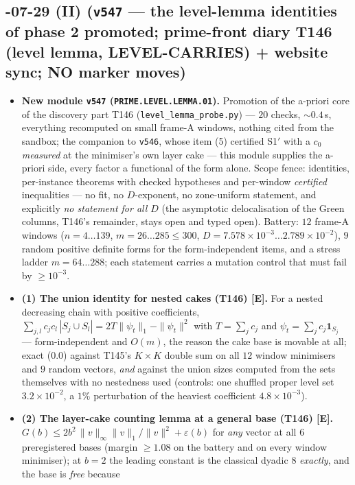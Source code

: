 \documentclass[11pt]{article}
\providecommand{\mE}{\textbf{[E]}}\providecommand{\mC}{\textbf{[C]}}
\begin{document}
\subsection*{-07-29 (II) (\texttt{v547} --- the level-lemma identities of phase 2 promoted; prime-front diary T146 (level lemma, LEVEL-CARRIES) + website sync; NO marker moves)}
\begin{itemize}[leftmargin=1.5em]
\item \textbf{New module \texttt{v547} (\texttt{PRIME.LEVEL.LEMMA.01}).} Promotion of the a-priori
core of the discovery part T146 (\texttt{level\_lemma\_probe.py}) --- $20$ checks, ${\sim}0.4$\,s,
everything recomputed on small frame-A windows, nothing cited from the sandbox; the companion to
\texttt{v546}, whose item (5) certified S1$'$ with a $c_0$ \emph{measured} at the minimiser's own
layer cake --- this module supplies the a-priori side, every factor a functional of the form alone.
Scope fence: identities, per-instance theorems with checked hypotheses and per-window
\emph{certified} inequalities --- no fit, no $D$-exponent, no zone-uniform statement, and explicitly
\emph{no statement for all $D$} (the asymptotic delocalisation of the Green columns, T146's
remainder, stays open and typed open). Battery: $12$ frame-A windows ($n=4\ldots139$,
$m=26\ldots285\le300$, $D=7.578\times10^{-3}\ldots2.789\times10^{-2}$), $9$ random positive definite
forms for the form-independent items, and a stress ladder $m=64\ldots288$; each statement carries a
mutation control that must fail by $\ge10^{-3}$.
\item \textbf{(1) The union identity for nested cakes (T146) \mE.} For a nested decreasing chain
with positive coefficients,
$\sum_{j,l}c_jc_l\,|S_j\cup S_l|=2T\|\psi_t\|_1-\|\psi_t\|^2$ with $T=\sum_jc_j$ and
$\psi_t=\sum_jc_j\mathbf 1_{S_j}$ --- form-independent and $O(m)$, the reason the cake base is
movable at all; exact ($0.0$) against T145's $K\times K$ double sum on all $12$ window minimisers
and $9$ random vectors, \emph{and} against the union sizes computed from the sets themselves with
no nestedness used (controls: one shuffled proper level set $3.2\times10^{-2}$, a $1\%$
perturbation of the heaviest coefficient $4.8\times10^{-3}$).
\item \textbf{(2) The layer-cake counting lemma at a general base (T146) \mE.}
$G(b)\le2b^2\,\|v\|_\infty\|v\|_1/\|v\|^2+\varepsilon(b)$ for \emph{any} vector at all $6$
preregistered bases (margin $\ge1.08$ on the battery and on every window minimiser); at $b=2$ the
leading constant is the classical dyadic $8$ \emph{exactly}, and the base is \emph{free} because

\end{itemize}
\end{document}
